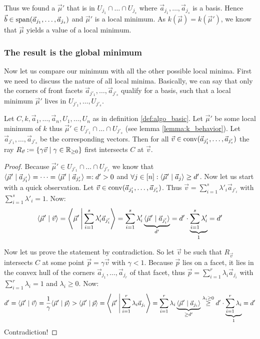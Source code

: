 Thus we found a $\vec\mu'$ that is in $U_{j_1} \cap \dots \cap U_{j_{s}}$ where $\vec a_{j_1}, \dots, \vec a_{j_s}$ is a basis. Hence $\vec b \in \operatorname{span}(\vec a_{j_1}, \dots, \vec a_{j_s})$ and $\vec\mu'$ is a local minimum. As $k(\vec\mu) = k(\vec\mu')$, we know that $\vec\mu$ yields a value of a local minimum. 

\subsubsection{The result is the global minimum}
Now let us compare our minimum with all the other possible local minima. First we need to discuss the nature of all local minima. Basically, we can say that only the corners of front facets $\vec a_{j'_1}, \dots, \vec a_{j'_s}$ qualify for a basis, such that a local minimum $\vec\mu'$ lives in $U_{j'_1}, \dots, U_{j'_s}$.

\begin{lemma}
    \label{lemma:local_minimum_faces_is_visible_from_origin}
    Let $C, k, \vec a_1, \dots, \vec a_n, U_1, \dots, U_n$ as in definition \ref{def:algo_basic}. Let $\vec\mu'$ be some local minimum of $k$ thus $\vec\mu' \in U_{j'_1}\cap \dots \cap U_{j'_s}$ (see lemma \ref{lemma:k_behavior}). Let $\vec a_{j'_1}, \dots, \vec a_{j'_s}$ be the corresponding vectors. Then for all $\vec v \in \operatorname{conv}(\vec a_{j'_1}, \dots, \vec a_{j'_s})$ the ray $R_{\vec v} := \{\gamma\vec v \mid \gamma \in \mathbb{R}_{\geq 0}\}$ first intersects $C$ at $\vec v$.
\end{lemma}
\begin{proof}
    Because $\vec \mu' \in U_{j'_1}\cap \dots \cap U_{j'_r}$ we know that $\langle \vec\mu' \mid \vec a_{j'_1} \rangle = \dots = \langle \vec\mu' \mid \vec a_{j'_r} \rangle =: d' > 0$ and $\forall j\in [n]: \langle \vec\mu' \mid \vec a_j \rangle \geq d'$. Now let us start with a quick observation. Let $\vec v \in \operatorname{conv}(\vec a_{j'_1}, \dots, \vec a_{j'_s})$. Thus $\vec v = \sum_{i=1}^{s}\lambda'_i\vec a_{j'_i}$ with $\sum_{i=1}^{s}\lambda'_i = 1$. Now:
    $$\langle \vec\mu' \mid \vec v \rangle = \left\langle \vec\mu' \,\middle|\, \sum_{i=1}^{s}\lambda'_i\vec a_{j'_i} \right\rangle = \sum_{i=1}^{s}\lambda'_i \underbrace{\langle \vec\mu' \mid \vec a_{j'_i} \rangle}_{d'} = d'\cdot \underbrace{\sum_{i=1}^{s}\lambda'_i}_1 = d'$$

    Now let us prove the statement by contradiction. So let $\vec v$ be such that $R_{\vec v}$ intersects $C$ at some point $\vec p = \gamma \vec v$ with $\gamma < 1$. Because $\vec p$ lies on a facet, it lies in the convex hull of the corners $\vec a_{j_1}, \dots, \vec a_{j_r}$ of that facet, thus $\vec p = \sum_{i=1}^{r}\lambda_i\vec a_{j_i}$ with $\sum_{i=1}^{r}\lambda_i = 1$ and $\lambda_i \geq 0$. Now:
    $$d' = \langle \vec\mu' \mid \vec v \rangle = \frac{1}{\gamma} \langle \vec\mu' \mid \vec p \rangle > \langle \vec\mu' \mid \vec p \rangle = \left\langle \vec\mu' \,\middle|\, \sum_{i=1}^{r}\lambda_i\vec a_{j_i} \right\rangle = \sum_{i=1}^{r}\lambda_i\underbrace{\langle \vec\mu' \mid \vec a_{j_i} \rangle}_{\geq d'} \stackrel{\lambda_i\geq0}{\geq} d'\cdot \underbrace{\sum_{i=1}^{r}\lambda_i}_1 = d'$$
    Contradiction!
\end{proof}

